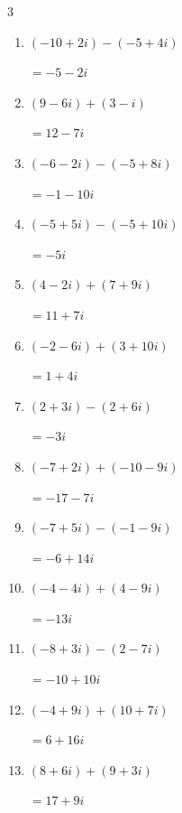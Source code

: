 \begin{multicols}{3}
\begin{enumerate}
  \item $\displaystyle (-10+2i) - (-5+4i)$

        $\displaystyle =-5-2i$

  \item $\displaystyle (9-6i) + (3-i)$

        $\displaystyle =12-7i$

  \item $\displaystyle (-6-2i) - (-5+8i)$

        $\displaystyle =-1-10i$

  \item $\displaystyle (-5+5i) - (-5+10i)$

        $\displaystyle =-5i$

  \item $\displaystyle (4-2i) + (7+9i)$

        $\displaystyle =11+7i$

  \item $\displaystyle (-2-6i) + (3+10i)$

        $\displaystyle =1+4i$

  \item $\displaystyle (2+3i) - (2+6i)$

        $\displaystyle =-3i$

  \item $\displaystyle (-7+2i) + (-10-9i)$

        $\displaystyle =-17-7i$

  \item $\displaystyle (-7+5i) - (-1-9i)$

        $\displaystyle =-6+14i$

  \item $\displaystyle (-4-4i) + (4-9i)$

        $\displaystyle =-13i$

\columnbreak %

\resetques

  \item $\displaystyle (-8+3i) - (2-7i)$

        $\displaystyle =-10+10i$

  \item $\displaystyle (-4+9i) + (10+7i)$

        $\displaystyle =6+16i$

  \item $\displaystyle (8+6i) + (9+3i)$

        $\displaystyle =17+9i$


\end{enumerate}
\end{multicols}

